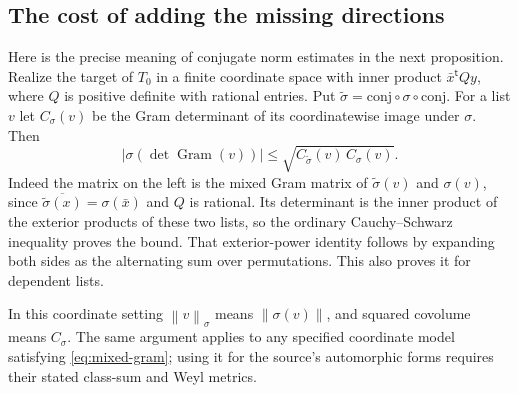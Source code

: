 \documentclass[11pt,a4paper]{article}
\theoremstyle{definition}
\newcommand{\vnorm}[1]{\left\lVert#1\right\rVert}
\newcommand{\abs}[1]{\left|#1\right|}
\begin{document}
\subsection{The cost of adding the missing directions}
Here is the precise meaning of conjugate norm estimates in the next proposition.
Realize the target of \(T_0\) in a finite coordinate space with inner product
\(\bar x^{\mathsf t}Qy\), where \(Q\) is positive definite with rational entries.
Put \(\tilde\sigma=\mathrm{conj}\circ\sigma\circ\mathrm{conj}\).
For a list \(v\) let \(C_\sigma(v)\) be the Gram determinant of its
coordinatewise image under \(\sigma\). Then
\begin{equation}\label{eq:mixed-gram}
 \abs{\sigma(\det\operatorname{Gram}(v))}
 \le\sqrt{C_{\tilde\sigma}(v)\,C_\sigma(v)}.
\end{equation}
Indeed the matrix on the left is the mixed Gram matrix of
\(\tilde\sigma(v)\) and \(\sigma(v)\), since
\(\overline{\tilde\sigma(x)}=\sigma(\bar x)\) and \(Q\) is rational.
Its determinant is the inner product of the exterior products of these
two lists, so the ordinary Cauchy--Schwarz inequality proves the bound.
That exterior-power identity follows by expanding both sides as the
alternating sum over permutations. This also proves it for dependent lists.

In this coordinate setting \(\vnorm v_\sigma\) means
\(\vnorm{\sigma(v)}\), and squared covolume means \(C_\sigma\).
The same argument applies to any specified coordinate model satisfying
\eqref{eq:mixed-gram}; using it for the source's automorphic forms
requires their stated class-sum and Weyl metrics.
\end{document}
